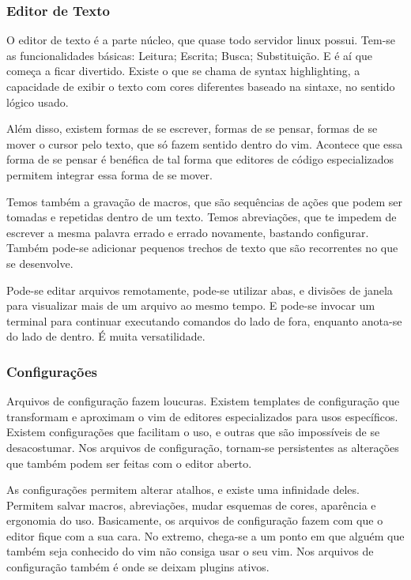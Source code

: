 \documentclass[a4paper, 12pt]{article}
\begin{document}
\subsubsection{Editor de Texto}
O editor de texto é a parte núcleo, que quase todo servidor linux possui.
Tem-se as funcionalidades básicas: Leitura; Escrita; Busca; Substituição.
E é aí que começa a ficar divertido.
Existe o que se chama de syntax highlighting, a capacidade de exibir o texto com cores diferentes baseado na sintaxe, no sentido lógico usado.

Além disso, existem formas de se escrever, formas de se pensar, formas de se mover o cursor pelo texto, que só fazem sentido dentro do vim.
Acontece que essa forma de se pensar é benéfica de tal forma que editores de código especializados permitem integrar essa forma de se mover.

Temos também a gravação de macros, que são sequências de ações que podem ser tomadas e repetidas dentro de um texto.
Temos abreviações, que te impedem de escrever a mesma palavra errado e errado novamente, bastando configurar.
Também pode-se adicionar pequenos trechos de texto que são recorrentes no que se desenvolve.

Pode-se editar arquivos remotamente, pode-se utilizar abas, e divisões de janela para visualizar mais de um arquivo ao mesmo tempo.
E pode-se invocar um terminal para continuar executando comandos do lado de fora, enquanto anota-se do lado de dentro.
É muita versatilidade.

\subsubsection{Configurações}
Arquivos de configuração fazem loucuras.
Existem templates de configuração que transformam e aproximam o vim de editores especializados para usos específicos.
Existem configurações que facilitam o uso, e outras que são impossíveis de se desacostumar.
Nos arquivos de configuração, tornam-se persistentes as alterações que também podem ser feitas com o editor aberto.

As configurações permitem alterar atalhos, e existe uma infinidade deles.
Permitem salvar macros, abreviações, mudar esquemas de cores, aparência e ergonomia do uso.
Basicamente, os arquivos de configuração fazem com que o editor fique com a sua cara.
No extremo, chega-se a um ponto em que alguém que também seja conhecido do vim não consiga usar o seu vim. Nos arquivos de configuração também é onde se deixam plugins ativos.
\end{document}
